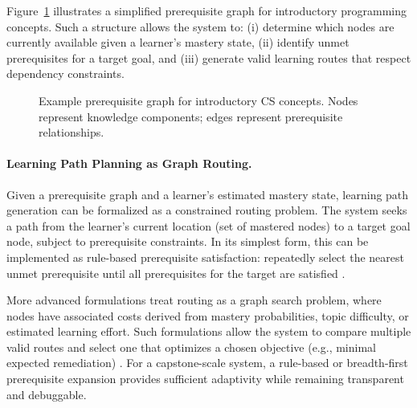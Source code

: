 \documentclass{article}
\begin{document}
Figure~\ref{fig:cs-prereq-graph} illustrates a simplified prerequisite graph for
introductory programming concepts. Such a structure allows the system to:
(i) determine which nodes are currently available given a learner’s mastery
state, (ii) identify unmet prerequisites for a target goal, and (iii) generate
valid learning routes that respect dependency constraints.

\begin{figure}[h]
\centering
{}
\caption{Example prerequisite graph for introductory CS concepts. Nodes represent
knowledge components; edges represent prerequisite relationships.}
\label{fig:cs-prereq-graph}
\end{figure}

\paragraph{Learning Path Planning as Graph Routing.}
Given a prerequisite graph and a learner’s estimated mastery state, learning path
generation can be formalized as a constrained routing problem. The system seeks a
path from the learner’s current location (set of mastered nodes) to a target goal
node, subject to prerequisite constraints. In its simplest form, this can be
implemented as rule-based prerequisite satisfaction: repeatedly select the
nearest unmet prerequisite until all prerequisites for the target are satisfied
\cite{brusilovsky2001}.

More advanced formulations treat routing as a graph search problem, where nodes
have associated costs derived from mastery probabilities, topic difficulty, or
estimated learning effort. Such formulations allow the system to compare multiple
valid routes and select one that optimizes a chosen objective (e.g., minimal
expected remediation) \cite{brusilovsky2001}. For a capstone-scale system, a
rule-based or breadth-first prerequisite expansion provides sufficient
adaptivity while remaining transparent and debuggable.
\end{document}
